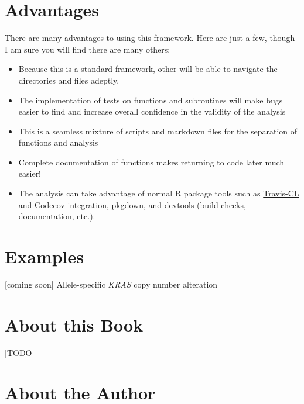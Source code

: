 \documentclass[]{book}
\providecommand{\tightlist}{%
  \setlength{\itemsep}{0pt}\setlength{\parskip}{0pt}}
\begin{document}
\section*{Advantages}\label{advantages}

There are many advantages to using this framework. Here are just a few,
though I am sure you will find there are many others:

\begin{itemize}
\tightlist
\item
  Because this is a standard framework, other will be able to navigate
  the directories and files adeptly.
\item
  The implementation of tests on functions and subroutines will make
  bugs easier to find and increase overall confidence in the validity of
  the analysis
\item
  This is a seamless mixture of scripts and markdown files for the
  separation of functions and analysis
\item
  Complete documentation of functions makes returning to code later much
  easier!
\item
  The analysis can take advantage of normal R package tools such as
  \href{https://travis-ci.org}{Travis-CL} and
  \href{https://codecov.io}{Codecov} integration,
  \href{https://pkgdown.r-lib.org}{pkgdown}, and
  \href{https://devtools.r-lib.org}{devtools} (build checks,
  documentation, etc.).
\end{itemize}

\section*{Examples}\label{examples}

{[}coming soon{]} Allele-specific \emph{KRAS} copy number alteration

\section*{About this Book}\label{about-this-book}

{[}TODO{]}

\section*{About the Author}\label{about-the-author}
\end{document}

